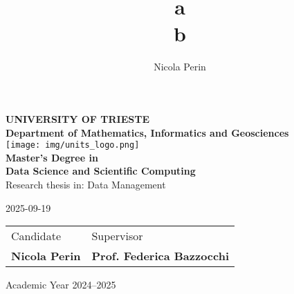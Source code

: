 
\newcommand\BackgroundPicFront{
	\put(-4,0){
		\parbox[b][\paperheight]{\paperwidth}{
			\vfill
			\centering
			{\transparent{0.07}\texttt{[image: img/units\_logo.png]}}
			\vfill
		}
	}
}

\title{a\\ b}
\author{Nicola Perin}

\begin{titlepage}
	\begin{center}
		{\LARGE {\bfseries UNIVERSITY OF TRIESTE \\}}
		{\Large {\bfseries Department of Mathematics, Informatics and Geosciences\\}}
		\vspace{1cm}
		\texttt{[image: img/units\_logo.png]}\\[1cm]
		
		\vfill
		{\Large \bfseries Master's Degree in\\}
		{\LARGE \bfseries Data Science and Scientific Computing \\}
		{\Large Research thesis in: Data Management \\}
		\vspace{1cm}
		
		{\huge \bfseries \thetitle}
		\vspace{1cm}
		
		{\large 2025-09-19 \\[1cm]}
		
		{\Large
			\setlength{\tabcolsep}{32pt}
			\begin{tabularx}{\linewidth}{ >{\raggedleft}X >{\raggedright\arraybackslash}X}
				Candidate & Supervisor \\
				\bfseries Nicola Perin & \bfseries Prof. Federica Bazzocchi\\ [5mm]
			\end{tabularx}
		}
		
		\vfill
		{\Large Academic Year 2024--2025}
	\end{center}
\end{titlepage}

\ClearShipoutPicture
\newgeometry{}
